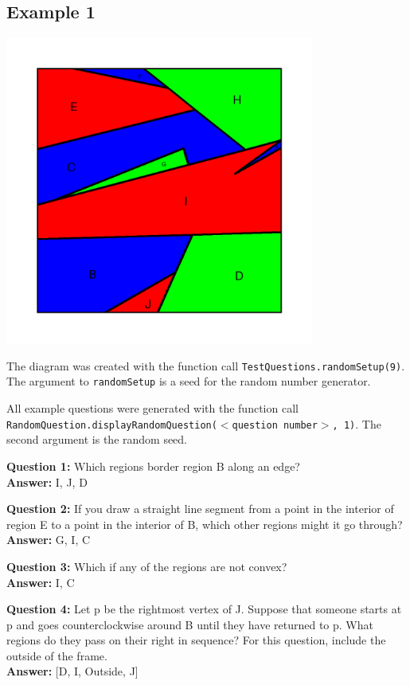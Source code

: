 \documentclass{article}    %
\begin{document}
\subsection{Example 1}
\begin{center}
\includegraphics[height=4in]{Maps/RandomSetup9.png}
\end{center}

{\small  The diagram was created with the function 
call {\tt TestQuestions.randomSetup(9)}.
	The argument to {\tt randomSetup} is a seed for the random 
	number generator.}

{\small All example questions were generated with the function call \\
{\tt RandomQuestion.displayRandomQuestion($<$question number$>$, 1)}.
The second argument is the random seed.}

{\bf Question 1:}
Which regions border region B along an edge? \\
{\bf Answer:}
{I, J, D}

{\bf Question 2:}
If you draw a straight line segment from a point in the interior of region E to  a point in the interior of B, which other regions might it go through? \\
{\bf Answer:}
{G, I, C}

{\bf Question 3:}
Which if any of the regions are not convex? \\
{\bf Answer:}
{I, C}

{\bf Question 4:}
Let p be the rightmost vertex of J. Suppose that someone starts at p and goes counterclockwise around B until they have returned to p. What regions do they pass on their right in sequence? For this question, include the outside of the frame. \\
{\bf Answer:}
[D, I, Outside, J]
\end{document}

